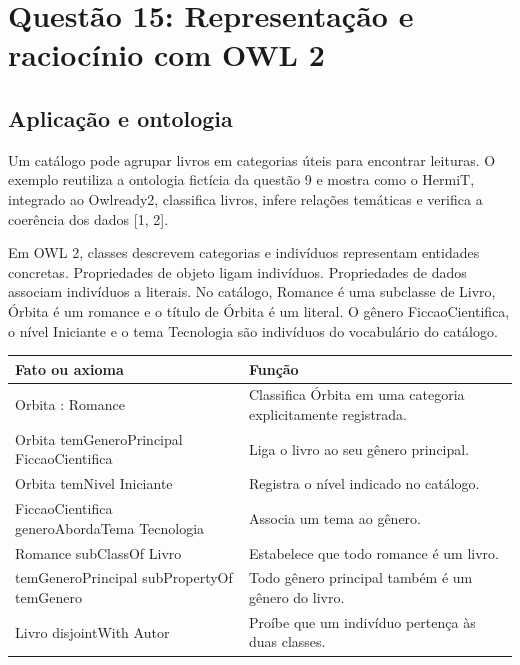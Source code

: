 \documentclass[12pt,a4paper]{article}
\begin{document}
\section{Questão 15: Representação e raciocínio com OWL 2}

\subsection{Aplicação e ontologia}

Um catálogo pode agrupar livros em categorias úteis para encontrar leituras. O exemplo reutiliza a ontologia fictícia da questão 9 e mostra como o HermiT, integrado ao Owlready2, classifica livros, infere relações temáticas e verifica a coerência dos dados [1, 2].

Em OWL 2, classes descrevem categorias e indivíduos representam entidades concretas. Propriedades de objeto ligam indivíduos. Propriedades de dados associam indivíduos a literais. No catálogo, Romance é uma subclasse de Livro, Órbita é um romance e o título de Órbita é um literal. O gênero FiccaoCientifica, o nível Iniciante e o tema Tecnologia são indivíduos do vocabulário do catálogo.

\begin{table}[H]
    \centering
    \begin{tabular}{>{\raggedright\arraybackslash}p{7.4cm} >{\raggedright\arraybackslash}p{7.4cm}}
        \toprule
        \textbf{Fato ou axioma} & \textbf{Função} \\
        \midrule
        Orbita : Romance & Classifica Órbita em uma categoria explicitamente registrada. \\
        \addlinespace
        Orbita temGeneroPrincipal FiccaoCientifica & Liga o livro ao seu gênero principal. \\
        \addlinespace
        Orbita temNivel Iniciante & Registra o nível indicado no catálogo. \\
        \addlinespace
        FiccaoCientifica generoAbordaTema Tecnologia & Associa um tema ao gênero. \\
        \addlinespace
        Romance subClassOf Livro & Estabelece que todo romance é um livro. \\
        \addlinespace
        temGeneroPrincipal subPropertyOf temGenero & Todo gênero principal também é um gênero do livro. \\
        \addlinespace
        Livro disjointWith Autor & Proíbe que um indivíduo pertença às duas classes. \\
        \bottomrule
    \end{tabular}
\end{table}
\end{document}
